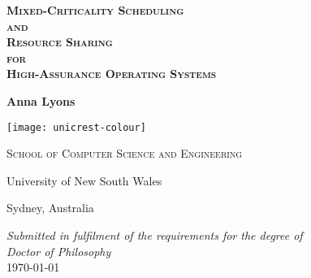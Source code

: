 \begin{titlepage}
{
    \thispagestyle{empty}
    \centering
    \null
    \vfill%
    \vfill%
    {%
        \Huge\sffamily\bfseries\scshape
        {Mixed-Criticality Scheduling}\\
        {and}\\
        {Resource Sharing}\\
    {for}\\
    {High-Assurance Operating Systems}\\
    }%
    \vspace{10mm}
    
    {%
        \LARGE\sffamily\bfseries
        Anna Lyons
    }%
    
    \vspace{10mm}
    
    
    \texttt{[image: unicrest-colour]}%
    
    
    \vspace{5mm}
    
    {
    \Large\scshape%
    {School of Computer Science and Engineering}
    
    \vspace{3mm}
    
    {University of New South Wales}

    {Sydney, Australia} 
    
    \vspace{10mm}
    }
    \emph{Submitted in fulfilment of the requirements for the degree of \\
    Doctor of Philosophy} \\[10mm]
    \monthyear\today
    \par%
    \vfill%
    \vfill%
    \vfill%
}
\end{titlepage}
\restoregeometry
